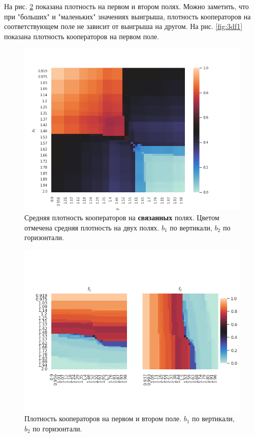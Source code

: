 \documentclass[12pt]{article}
\begin{document}
    На рис. \ref{fig:twoden} показана плотность на первом и втором полях. Можно заметить, что при "больших" и "маленьких" значениях выигрыша, плотность кооператоров на соответствующем поле не зависит от выигрыша на другом. На рис. \ref{fig:3df1} показана плотность кооператоров на первом поле.
    \begin{figure}[H]
         \centering
         \includegraphics[width=0.7\columnwidth, keepaspectratio=True]{DoubleField/right.png}
         \caption{Средняя плотность кооператоров на \textbf{связанных} полях. Цветом отмечена средняя плотность на двух полях. $b_1$ по вертикали, $b_2$ по горизонтали.}
         \label{fig:right}
    \end{figure}
    \begin{figure}[H]
         \centering
         \includegraphics[width=0.95\columnwidth, keepaspectratio=True]{DoubleField/twodensity.png}
         \caption{Плотность кооператоров на первом и втором поле. $b_1$ по вертикали, $b_2$ по горизонтали.}
         \label{fig:twoden}
    \end{figure}
    
\end{document}

